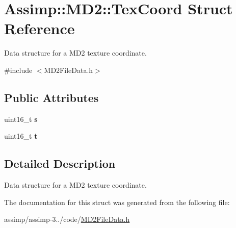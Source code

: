 \hypertarget{struct_assimp_1_1_m_d2_1_1_tex_coord}{\section{Assimp\+:\+:M\+D2\+:\+:Tex\+Coord Struct Reference}
\label{struct_assimp_1_1_m_d2_1_1_tex_coord}
}


Data structure for a M\+D2 texture coordinate.  




{\ttfamily \#include $<$M\+D2\+File\+Data.\+h$>$}

\subsection*{Public Attributes}
\begin{DoxyCompactItemize}
\item 
\hypertarget{struct_assimp_1_1_m_d2_1_1_tex_coord_aaa10e954dd8666ae9d5c8bc6cf67a967}{uint16\+\_\+t {\bfseries s}}\label{struct_assimp_1_1_m_d2_1_1_tex_coord_aaa10e954dd8666ae9d5c8bc6cf67a967}

\item 
\hypertarget{struct_assimp_1_1_m_d2_1_1_tex_coord_a6c5571395eef228dae99750a7a8f0477}{uint16\+\_\+t {\bfseries t}}\label{struct_assimp_1_1_m_d2_1_1_tex_coord_a6c5571395eef228dae99750a7a8f0477}

\end{DoxyCompactItemize}


\subsection{Detailed Description}
Data structure for a M\+D2 texture coordinate. 

The documentation for this struct was generated from the following file\+:\begin{DoxyCompactItemize}
\item 
assimp/assimp-\/3../code/\hyperlink{_m_d2_file_data_8h}{M\+D2\+File\+Data.\+h}\end{DoxyCompactItemize}
